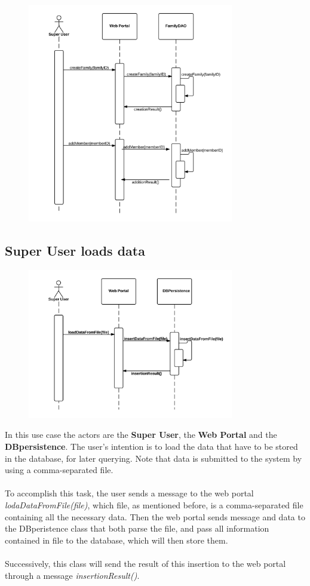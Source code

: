 \begin{figure}[ht!]
	\centering
	\includegraphics[width=90mm]{../Slides/images/Presentation_short_SSD_2.png}
	\label{overflow}
	\end{figure}
\subsection{Super User loads data}
	\begin{figure}[ht!]
	\centering
	\includegraphics[width=90mm]{../Slides/images/Presentation_short_SSD_3.png}
	\label{overflow}
	\end{figure}
In this use case the actors are the \textbf{Super User}, the \textbf{Web Portal} and the \textbf{DBpersistence}. The user's intention is to load the data that have to be stored in the database, for later querying. Note that data is submitted to the system by using a comma-separated file. \\
\\To accomplish this task, the user sends a message to the web portal \emph{lodaDataFromFile(file)}, which file, as mentioned before, is a comma-separated file containing all the necessary data. Then the web portal sends message and data to the DBperistence class that both parse the file, and pass all information contained in file to the database, which will then store them. \\
\\Successively, this class will send the result of this insertion to the web portal through a message \emph{insertionResult()}.

